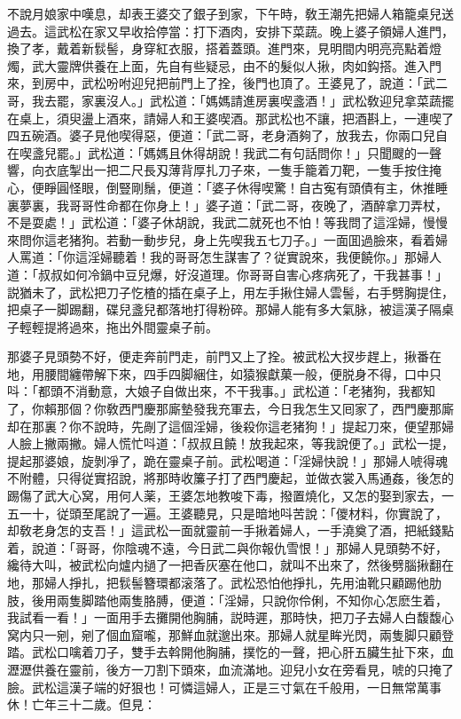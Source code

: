 不說月娘家中嘆息，却表王婆交了銀子到家，下午時，敎王潮先把婦人箱籠桌兒送過去。這武松在家又早收拾停當：打下酒肉，安排下菜蔬。晚上婆子領婦人進門，換了孝，戴着新䯼髻，身穿紅衣服，搭着蓋頭。進門來，見明間内明亮亮點着燈燭，武大靈牌供養在上面，先自有些疑忌，由不的髮似人揪，肉如鈎搭。進入門來，到房中，武松吩咐迎兒把前門上了拴，後門也頂了。王婆見了，說道：「武二哥，我去罷，家裏沒人。」武松道：「媽媽請進房裏喫盞酒！」武松敎迎兒拿菜蔬擺在桌上，須臾盪上酒來，請婦人和王婆喫酒。那武松也不讓，把酒斟上，一連喫了四五碗酒。婆子見他喫得惡，便道：「武二哥，老身酒夠了，放我去，你兩口兒自在喫盞兒罷。」武松道：「媽媽且休得胡說！我武二有句話問你！」只聞颼的一聲響，向衣底掣出一把二尺長刄薄背厚扎刀子來，一隻手籠着刀靶，一隻手按住掩心，便睜圓怪眼，倒豎剛鬚，便道：「婆子休得喫驚！自古寃有頭債有主，休推睡裏夢裏，我哥哥性命都在你身上！」婆子道：「武二哥，夜晚了，酒醉拿刀弄杖，不是耍處！」武松道：「婆子休胡說，我武二就死也不怕！等我問了這淫婦，慢慢來問你這老猪狗。若動一動步兒，身上先喫我五七刀子。」一面囬過臉來，看着婦人罵道：「你這淫婦聽着！我的哥哥怎生謀害了？従實說來，我便饒你。」那婦人道：「叔叔如何冷鍋中豆兒爆，好沒道理。你哥哥自害心疼病死了，干我甚事！」説猶未了，武松把刀子忔楂的插在桌子上，用左手揪住婦人雲髻，右手劈胸提住，把桌子一脚踢翻，碟兒盞兒都落地打得粉碎。那婦人能有多大氣脉，被這漢子隔桌子輕輕提將過來，拖出外間靈桌子前。

那婆子見頭勢不好，便走奔前門走，前門又上了拴。被武松大扠步趕上，揪番在地，用腰間纏帶解下來，四手四脚綑住，如猿猴獻菓一般，便脱身不得，口中只呌：「都頭不消動意，大娘子自做出來，不干我事。」武松道：「老猪狗，我都知了，你賴那個？你敎西門慶那廝墊發我充軍去，今日我怎生又囘家了，西門慶那廝却在那裏？你不說時，先剮了這個淫婦，後殺你這老猪狗！」提起刀來，便望那婦人臉上撇兩撇。婦人慌忙呌道：「叔叔且饒！放我起來，等我說便了。」武松一提，提起那婆娘，旋剝凈了，跪在靈桌子前。武松喝道：「淫婦快說！」那婦人唬得魂不附體，只得従實招說，將那時收簾子打了西門慶起，並做衣裳入馬通姦，後怎的踢傷了武大心窝，用何人薬，王婆怎地教唆下毒，撥置燒化，又怎的娶到家去，一五一十，従頭至尾說了一遍。王婆聽見，只是暗地呌苦說：「儍材料，你實說了，却敎老身怎的支吾！」這武松一面就靈前一手揪着婦人，一手澆奠了酒，把紙錢點着，說道：「哥哥，你陰魂不遠，今日武二與你報仇雪恨！」那婦人見頭勢不好，纔待大叫，被武松向爐内撾了一把香灰塞在他口，就叫不出來了，然後劈腦揪翻在地，那婦人掙扎，把䯼髻簪環都滚落了。武松恐怕他掙扎，先用油靴只顧踢他肋肢，後用兩隻脚踏他兩隻胳膊，便道：「淫婦，只說你伶俐，不知你心怎麽生着，我試看一看！」一面用手去攤開他胸脯，説時遲，那時快，把刀子去婦人白馥馥心窝内只一剜，剜了個血窟嚨，那鮮血就邈出來。那婦人就星眸光閃，兩隻脚只顧登踏。武松口噙着刀子，雙手去斡開他胸脯，撲忔的一聲，把心肝五臟生扯下來，血瀝瀝供養在靈前，後方一刀割下頭來，血流滿地。迎兒小女在旁看見，唬的只掩了臉。武松這漢子端的好狠也！可憐這婦人，正是三寸氣在千般用，一日無常萬事休！亡年三十二歲。但見：

